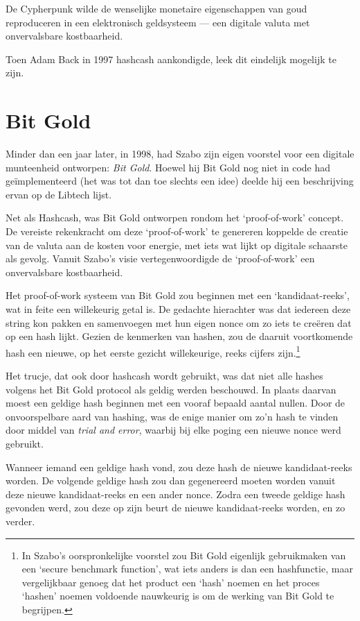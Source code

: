 \documentclass[smalldemyvopaper,11pt,twoside,onecolumn,openright,extrafontsizes,hidelinks]{memoir}
\begin{document}
De Cypherpunk wilde de wenselijke monetaire eigenschappen van goud
reproduceren in een elektronisch geldsysteem --- een digitale valuta met
onvervalsbare kostbaarheid.

Toen Adam Back in 1997 hashcash aankondigde, leek dit eindelijk mogelijk
te zijn.

\section{Bit Gold}\label{bit-gold-1}

Minder dan een jaar later, in 1998, had Szabo zijn eigen voorstel voor
een digitale munteenheid ontworpen: \emph{Bit Gold}. Hoewel hij Bit Gold
nog niet in code had geïmplementeerd (het was tot dan toe slechts een
idee) deelde hij een beschrijving ervan op de Libtech lijst.

Net als Hashcash, was Bit Gold ontworpen rondom het `proof-of-work'
concept. De vereiste rekenkracht om deze `proof-of-work' te genereren
koppelde de creatie van de valuta aan de kosten voor energie, met iets
wat lijkt op digitale schaarste als gevolg. Vanuit Szabo's visie
vertegenwoordigde de `proof-of-work' een onvervalsbare kostbaarheid.

Het proof-of-work systeem van Bit Gold zou beginnen met een
`kandidaat-reeks', wat in feite een willekeurig getal is. De gedachte
hierachter was dat iedereen deze string kon pakken en samenvoegen met
hun eigen nonce om zo iets te creëren dat op een hash lijkt. Gezien de
kenmerken van hashen, zou de daaruit voortkomende hash een nieuwe, op
het eerste gezicht willekeurige, reeks cijfers zijn.\footnote{In Szabo's
  oorspronkelijke voorstel zou Bit Gold eigenlijk gebruikmaken van een
  `secure benchmark function', wat iets anders is dan een hashfunctie,
  maar vergelijkbaar genoeg dat het product een `hash' noemen en het
  proces `hashen' noemen voldoende nauwkeurig is om de werking van Bit
  Gold te begrijpen.}

Het trucje, dat ook door hashcash wordt gebruikt, was dat niet alle
hashes volgens het Bit Gold protocol als geldig werden beschouwd. In
plaats daarvan moest een geldige hash beginnen met een vooraf bepaald
aantal nullen. Door de onvoorspelbare aard van hashing, was de enige
manier om zo'n hash te vinden door middel van \emph{trial and error},
waarbij bij elke poging een nieuwe nonce werd gebruikt.

Wanneer iemand een geldige hash vond, zou deze hash de nieuwe
kandidaat-reeks worden. De volgende geldige hash zou dan gegenereerd
moeten worden vanuit deze nieuwe kandidaat-reeks en een ander nonce.
Zodra een tweede geldige hash gevonden werd, zou deze op zijn beurt de
nieuwe kandidaat-reeks worden, en zo verder.
\end{document}
